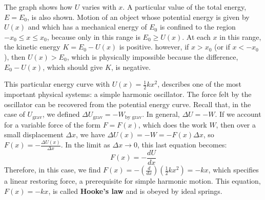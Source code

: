 \documentclass{article}
\begin{document}
\begin{example}
\begin{center}

\end{center}
The graph shows how $U$ varies with $x$. A particular value of the total energy, $E = E_{0}$, is also shown.
Motion of an object whose potential energy is given by $U(x)$ and which has a mechanical energy of $E_{0}$ is confined to the region $-x_{0} \le x \le x_{0}$, because only in this range is $E_{0} \ge U(x)$.
At each $x$ in this range, the kinetic energy $K = E_{0} - U(x)$ is positive. however, if $x > x_{0}$ (or if $x < -x_{0}$), then $U(x) > E_{0}$, which is physically impossible because the difference, $E_{0} - U(x)$, which should give $K$, is negative.

This particular energy curve with $U(x) = \frac{1}{2}kx^{2}$, describes one of the most important physical systems: a simple harmonic oscillator. The force felt by the oscillator can be recovered from the potential energy curve. 
Recall that, in the case of $U_{\text{grav}}$, we defined $\Delta U_{\text{grav}}=-W_{\text{by grav}}$.
In general, $\Delta U = -W$. If we account for a variable force of the form $F = F(x)$, which does the work $W$, then over a small displacement $\Delta x$, we have $\Delta U(x) = -W = -F(x) \Delta x$, so $F(x) = -\frac{\Delta U(x)}{\Delta x}$.
In the limit as $\Delta x \rightarrow 0$, this last equation becomes:
\begin{equation*}
    F(x) = -\frac{dU}{dx}
\end{equation*}
Therefore, in this case, we find $F(x) = -(\frac{d}{dx})(\frac{1}{2}kx^{2}) = -kx$, which specifies a linear restoring force, a prerequisite for simple harmonic motion. 
This equation, $F(x) = -kx$, is called \textbf{Hooke's law} and is obeyed by ideal springs.


\end{example}
\end{document}
